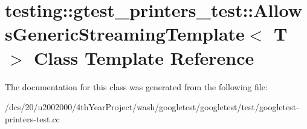 \hypertarget{classtesting_1_1gtest__printers__test_1_1AllowsGenericStreamingTemplate}{}\section{testing\+:\+:gtest\+\_\+printers\+\_\+test\+:\+:Allows\+Generic\+Streaming\+Template$<$ T $>$ Class Template Reference}
\label{classtesting_1_1gtest__printers__test_1_1AllowsGenericStreamingTemplate}


The documentation for this class was generated from the following file\+:\begin{DoxyCompactItemize}
\item 
/dcs/20/u2002000/4th\+Year\+Project/wash/googletest/googletest/test/googletest-\/printers-\/test.\+cc\end{DoxyCompactItemize}
